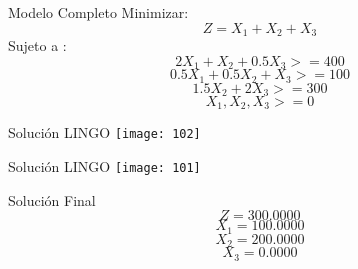 \documentclass{beamer}
\begin{document}
\begin{frame}[fragile]{Modelo Completo}
Minimizar:
\[Z = X_{1} + X_{2} + X_{3}\]
Sujeto a :\\
\[2X_{1} + X_{2} +0.5X_{3}  >= 400\]
\[0.5X_{1} + 0.5X_{2} +X_{3} >= 100\]
\[1.5 X_{2} + 2X_{3} >= 300\]
\[X_{1}, X_{2}, X_{3} >= 0\]

\end{frame}

\begin{frame}[fragile]{Solución LINGO}
    \texttt{[image: 102]}
\end{frame}
\begin{frame}[fragile]{Solución LINGO}
    \texttt{[image: 101]}
\end{frame}

\begin{frame}[fragile]{Solución Final}
\[Z = 300.0000\]
\[X_{1} = 100.0000\]
\[X_{2} = 200.0000\]
\[X_{3} = 0.0000\]
\end{frame}
\end{document}

